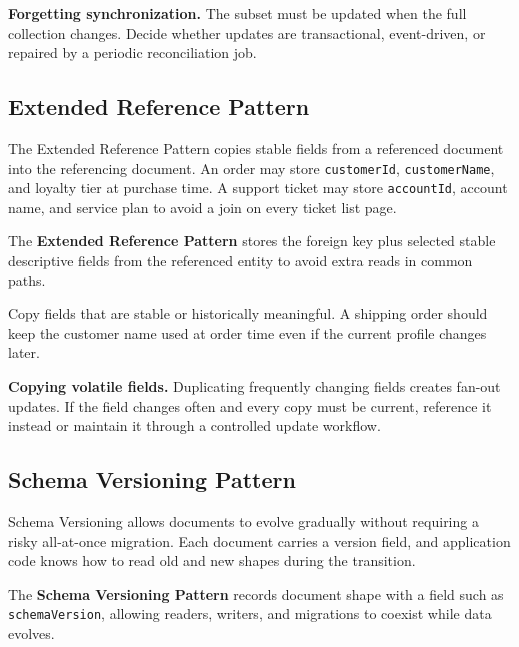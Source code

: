 \begin{pitfall}
\textbf{Forgetting synchronization.} The subset must be updated when the full collection changes. Decide whether updates are transactional, event-driven, or repaired by a periodic reconciliation job.
\end{pitfall}

\subsection{Extended Reference Pattern}
The Extended Reference Pattern copies stable fields from a referenced document into the referencing document. An order may store \texttt{customerId}, \texttt{customerName}, and loyalty tier at purchase time. A support ticket may store \texttt{accountId}, account name, and service plan to avoid a join on every ticket list page.

\begin{definitionbox}
The \textbf{Extended Reference Pattern} stores the foreign key plus selected stable descriptive fields from the referenced entity to avoid extra reads in common paths.
\end{definitionbox}

\begin{tipbox}
Copy fields that are stable or historically meaningful. A shipping order should keep the customer name used at order time even if the current profile changes later.
\end{tipbox}

\begin{pitfall}
\textbf{Copying volatile fields.} Duplicating frequently changing fields creates fan-out updates. If the field changes often and every copy must be current, reference it instead or maintain it through a controlled update workflow.
\end{pitfall}

\subsection{Schema Versioning Pattern}
Schema Versioning allows documents to evolve gradually without requiring a risky all-at-once migration. Each document carries a version field, and application code knows how to read old and new shapes during the transition.

\begin{definitionbox}
The \textbf{Schema Versioning Pattern} records document shape with a field such as \texttt{schemaVersion}, allowing readers, writers, and migrations to coexist while data evolves.
\end{definitionbox}

